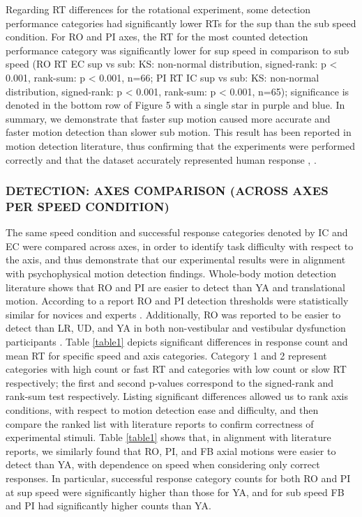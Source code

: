 \documentclass{ieeeaccess}
\begin{document}
\indent Regarding RT differences for the rotational experiment, some detection performance categories had significantly lower RTs for the sup than the sub speed condition. For RO and PI axes, the RT for the most counted detection performance category was significantly lower for sup speed in comparison to sub speed (RO RT EC sup vs sub: KS: non-normal distribution, signed-rank: p < 0.001, rank-sum: p < 0.001, n=66; PI RT IC sup vs sub: KS: non-normal distribution, signed-rank: p < 0.001, rank-sum: p < 0.001, n=65); significance is denoted in the bottom row of Figure 5 with a single star in purple and blue. In summary, we demonstrate that faster sup motion caused more accurate and faster motion detection than slower sub motion. This result has been reported in motion detection literature, thus confirming that the experiments were performed correctly and that the dataset accurately represented human response \cite{Valko_2012_Vestibular}, \cite{Hartmann_2014_Direction}.

\subsubsection{DETECTION: AXES COMPARISON (ACROSS AXES PER SPEED CONDITION)}
The same speed condition and successful response categories denoted by IC and EC were compared across axes, in order to identify task difficulty with respect to the axis, and thus demonstrate that our experimental results were in alignment with psychophysical motion detection findings. Whole-body motion detection literature shows that RO and PI are easier to detect than YA and translational motion. According to a report RO and PI detection thresholds were statistically similar for novices and experts \cite{Hartmann_2014_Direction}. Additionally, RO was reported to be easier to detect than LR, UD, and YA in both non-vestibular and vestibular dysfunction participants \cite{Valko_2012_Vestibular}. Table \ref{table1} depicts significant differences in response count and mean RT for specific speed and axis categories. Category 1 and 2 represent categories with high count or fast RT and categories with low count or slow RT respectively; the first and second p-values correspond to the signed-rank and rank-sum test respectively. Listing significant differences allowed us to rank axis conditions, with respect to motion detection ease and difficulty, and then compare the ranked list with literature reports to confirm correctness of experimental stimuli. Table \ref{table1} shows that, in alignment with literature reports, we similarly found that RO, PI, and FB axial motions were easier to detect than YA, with dependence on speed when considering only correct responses. In particular, successful response category counts for both RO and PI at sup speed were significantly higher than those for YA, and for sub speed FB and PI had significantly higher counts than YA.
\end{document}
